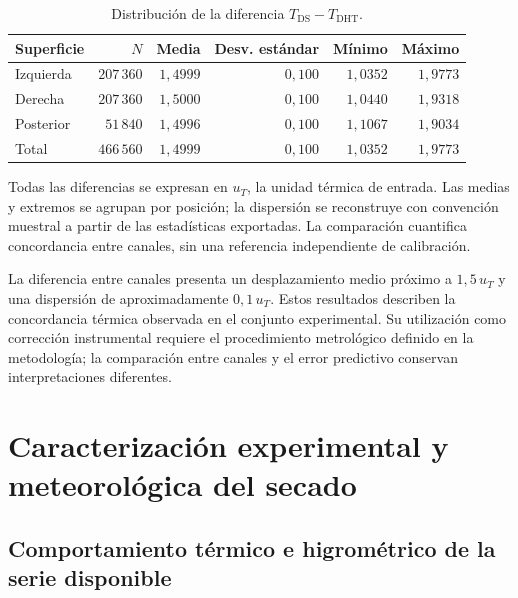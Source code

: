 \begin{table}[htbp]
\centering
\caption{Distribución de la diferencia $T_{\mathrm{DS}}-T_{\mathrm{DHT}}$.}
\label{tab:res_concordancia}
\small
\setlength{\tabcolsep}{5pt}
\begin{tabular}{lrrrrr}
\toprule
Superficie & $N$ & Media & Desv. estándar & Mínimo & Máximo \\
\midrule
Izquierda & $207\,360$ & $1{,}4999$ & $0{,}100$ & $1{,}0352$ & $1{,}9773$ \\
Derecha & $207\,360$ & $1{,}5000$ & $0{,}100$ & $1{,}0440$ & $1{,}9318$ \\
Posterior & $51\,840$ & $1{,}4996$ & $0{,}100$ & $1{,}1067$ & $1{,}9034$ \\
Total & $466\,560$ & $1{,}4999$ & $0{,}100$ & $1{,}0352$ & $1{,}9773$ \\
\bottomrule
\end{tabular}
\par\vspace{3pt}
\begin{minipage}{0.98\textwidth}\footnotesize
Todas las diferencias se expresan en $u_T$, la unidad térmica de entrada. Las medias y extremos se agrupan por posición; la dispersión se reconstruye con convención muestral a partir de las estadísticas exportadas. La comparación cuantifica concordancia entre canales, sin una referencia independiente de calibración.
\end{minipage}
\end{table}


La diferencia entre canales presenta un desplazamiento medio próximo a $1{,}5\,u_T$ y una dispersión de aproximadamente $0{,}1\,u_T$. Estos resultados describen la concordancia térmica observada en el conjunto experimental. Su utilización como corrección instrumental requiere el procedimiento metrológico definido en la metodología; la comparación entre canales y el error predictivo conservan interpretaciones diferentes.

\FloatBarrier

\section{Caracterización experimental y meteorológica del secado}
\label{res:serie_secado}

\subsection{Comportamiento térmico e higrométrico de la serie disponible}


